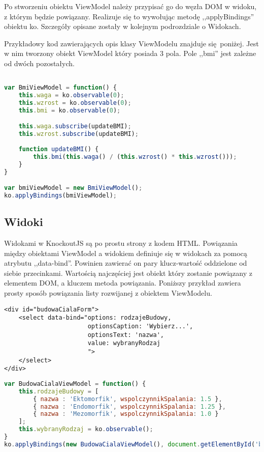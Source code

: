 Po stworzeniu obiektu ViewModel należy przypisać go do węzła DOM w widoku, z którym będzie powiązany. Realizuje się to wywołując metodę ,,applyBindings'' obiektu ko. Szczegóły opisane zostały w kolejnym podrozdziale o Widokach.

Przykładowy kod zawierających opis klasy ViewModelu znajduje się poniżej. Jest w nim tworzony obiekt ViewModel który posiada 3 pola. Pole ,,bmi'' jest zależne od dwóch pozostałych.

\begin{lstlisting}[language=JavaScript]

var BmiViewModel = function() {
	this.waga = ko.observable(0);
	this.wzrost = ko.observable(0);
	this.bmi = ko.observable(0);

    this.waga.subscribe(updateBMI);
    this.wzrost.subscribe(updateBMI);
	
	function updateBMI() {
		this.bmi(this.waga() / (this.wzrost() * this.wzrost()));
	}
}

var bmiViewModel = new BmiViewModel();
ko.applyBindings(bmiViewModel);

\end{lstlisting}


\subsection{Widoki}
Widokami w KnockoutJS są po prostu strony z kodem HTML. Powiązania między obiektami ViewModel a widokiem definiuje się w widokach za pomocą atrybutu ,,data-bind''. Powinien zawierać on pary klucz-wartość oddzielone od siebie przecinkami. Wartością najczęściej jest obiekt który zostanie powiązany z elementem DOM, a kluczem metoda powiązania. Poniższy przykład zawiera prosty sposób powiązania listy rozwijanej z obiektem ViewModelu.

\begin{lstlisting}[language=HTML5]
<div id="budowaCialaForm">
	<select data-bind="options: rodzajeBudowy,
					   optionsCaption: 'Wybierz...',
					   optionsText: 'nazwa',
					   value: wybranyRodzaj
					   ">
	</select>
</div>
\end{lstlisting}

\begin{lstlisting}[language=JavaScript]
var BudowaCialaViewModel = function() {
	this.rodzajeBudowy = [
		{ nazwa : 'Ektomorfik', wspolczynnikSpalania: 1.5 },
		{ nazwa : 'Endomorfik', wspolczynnikSpalania: 1.25 },
		{ nazwa : 'Mezomorfik', wspolczynnikSpalania: 1.0 }
	];
    this.wybranyRodzaj = ko.observable();
}
ko.applyBindings(new BudowaCialaViewModel(), document.getElementById('budowaCialaForm'));
\end{lstlisting}


